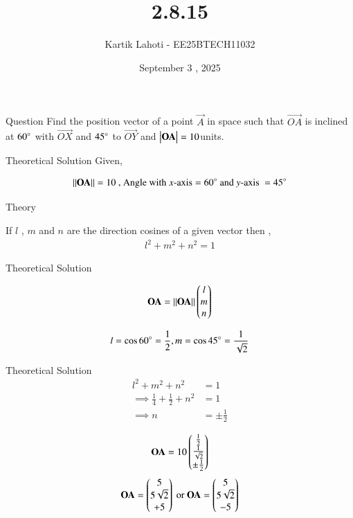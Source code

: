 \documentclass{beamer}
\title %
{2.8.15}
\date{September 3 , 2025}
\author 
{Kartik Lahoti - EE25BTECH11032}
\begin{document}
\frame{\titlepage}
\begin{frame}{Question}
Find the position vector of a point $\vec{A}$ in space such that $\vec{OA}$ is inclined at $60\degree$ with $\vec{OX}$ and $45\degree$ to $\vec{OY}$ and $\begin{vmatrix}\mathbf{OA}\end{vmatrix} = 10 $units.
\end{frame}



\begin{frame}{Theoretical Solution}
Given,

\begin{align}
    \left\lVert\mathbf{OA}\right\rVert = 10 \text{ , Angle with } x\text{-axis} = 60\degree \text{ and } y\text{-axis } = 45\degree
\end{align}

\end{frame}

\begin{frame}{Theory}

If $l$ , $m$ and $n$ are the direction cosines of a given vector then , 
\begin{align}
    l^2 + m^2 + n^2 = 1 
\end{align}

\end{frame}
\begin{frame}{Theoretical Solution}

\begin{align}
    \mathbf{OA} = \left\lVert\mathbf{OA}\right\rVert \begin{pmatrix}l \\ m \\ n\end{pmatrix}
\end{align}

\begin{align}
    l = \cos{60\degree} = \frac{1}{2} , m = \cos{45\degree} = \frac{1}{\sqrt{2}}
\end{align}
\end{frame}

\begin{frame}{Theoretical Solution}
\begin{align}
    l^2 + m^2 + n^2 &= 1\\
    \implies \frac{1}{4} + \frac{1}{2} + n^2  &= 1\\
    \implies n &= \pm \frac{1}{2}
\end{align}

\begin{align}
    \mathbf{OA} = 10\begin{pmatrix}\frac{1}{2} \\ \frac{1}{\sqrt{2}} \\ \pm \frac{1}{2}\end{pmatrix}
\end{align}
\begin{align}
    \mathbf{OA} = \begin{pmatrix}5 \\ 5\sqrt{2} \\ +5\end{pmatrix} \text{ or } \mathbf{OA} = \begin{pmatrix}5 \\ 5\sqrt{2} \\ -5\end{pmatrix} 
\end{align}
\end{frame}
\end{document}
